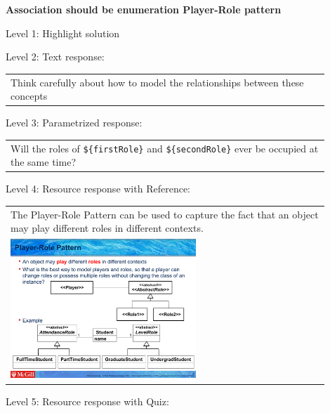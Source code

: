 \noindent \textbf{Association should be enumeration Player-Role pattern} \medskip

\noindent Level 1: Highlight solution \medskip

\noindent Level 2: Text response: \medskip

\begin{tabular}{|p{0.9\linewidth}}
Think carefully about how to model the relationships between these concepts
\end{tabular} \medskip

\noindent Level 3: Parametrized response: \medskip

\begin{tabular}{|p{0.9\linewidth}}
Will the roles of \verb|${firstRole}| and \verb|${secondRole}| ever be occupied at the same time?
\end{tabular} \medskip

\noindent Level 4: Resource response with Reference: \medskip

\begin{tabular}{|p{0.9\linewidth}}
The Player-Role Pattern can be used to capture the fact that an object may play different roles
in different contexts.

\\
\includegraphics[width=0.6\textwidth]{images/player_role.png}
\end{tabular} \medskip

\noindent Level 5: Resource response with Quiz: \medskip


